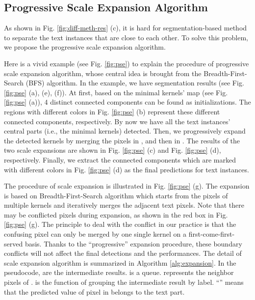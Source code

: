 \documentclass{article}
\begin{document}
\subsection{Progressive Scale Expansion Algorithm}
As shown in Fig. \ref{fig:diff-meth-res} (c), it is hard for segmentation-based method to separate the text instances that are close to each other. To solve this problem, we propose the progressive scale expansion algorithm. 



Here is a vivid example (see Fig. \ref{fig:pse}) to explain the procedure of progressive scale expansion algorithm, whose central idea is brought from the Breadth-First-Search (BFS) algorithm. In the example, we have  segmentation results  (see Fig. \ref{fig:pse} (a), (e), (f)). At first, based on the minimal kernels' map  (see Fig. \ref{fig:pse} (a)), 4 distinct connected components  can be found as initializations. The regions with different colors in Fig. \ref{fig:pse} (b) represent these different connected components, respectively. By now we have all the text instances' central parts (i.e., the minimal kernels) detected. 
Then, we progressively expand the detected kernels by merging the pixels in , and then in . The results of the two scale expansions are shown in Fig. \ref{fig:pse} (c) and Fig. \ref{fig:pse} (d), respectively.
Finally, we extract the connected components which are marked with different colors in Fig. \ref{fig:pse} (d) as the final predictions for text instances.


The procedure of scale expansion is illustrated in Fig. \ref{fig:pse} (g). The expansion is based on Breadth-First-Search algorithm which starts from the pixels of multiple kernels and iteratively merges the adjacent text pixels. Note that there may be conflicted pixels during expansion, as shown in the red box in Fig. \ref{fig:pse} (g). The principle to deal with the conflict in our practice is that the confusing pixel can only be merged by one single kernel on a first-come-first-served basis. Thanks to the ``progressive'' expansion procedure, these boundary conflicts will not affect the final detections and the performances.
The detail of scale expansion algorithm is summarized in Algorithm \ref{alg:expansion}. In the pseudocode,  are the intermediate results.  is a queue.  represents the neighbor pixels of .  is the function of grouping the intermediate result by label. ``'' means that the predicted value of pixel  in  belongs to the text part.
\end{document}
